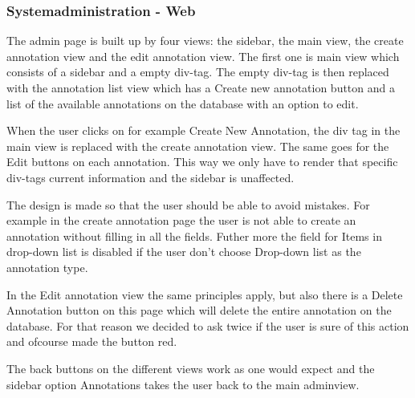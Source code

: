 \subsubsection{Systemadministration - Web}
The admin page is built up by four views: the sidebar, the main view, the create annotation view and the edit annotation view. The first one is main view which consists of a sidebar and a empty div-tag. 
The empty div-tag is then replaced with the annotation list view which has a Create new annotation button 
and a list of the available annotations on the database with an option to edit. 

When the user clicks on for example Create New Annotation, the div tag in the main view is replaced with the create annotation view.
The same goes for the Edit buttons on each annotation. This way we only have to render that specific div-tags current information 
and the sidebar is unaffected. 

The design is made so that the user should be able to avoid mistakes. For example in the 
create annotation page the user is not able to create an annotation without filling in all the fields. Futher more the 
field for Items in drop-down list is disabled if the user don't choose Drop-down list as the annotation type. 

In the Edit annotation view the same principles apply, but also there is a Delete Annotation button on this page which will
delete the entire annotation on the database.
For that reason we decided to ask twice if the user is sure of this action and ofcourse made the button red.

The back buttons on the different views work as one would expect and the sidebar option Annotations takes the user back to the main adminview.
